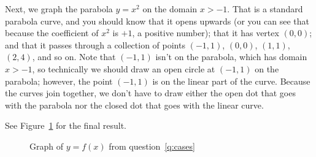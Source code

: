 \documentclass{article}
\begin{document}
\begin{enumerate}
  Next, we graph the parabola $y=x^2$ on the domain $x>-1$.  That is a 
  standard parabola curve, and you should know that it opens upwards
  (or you can see that because the coefficient of $x^2$ is $+1$, a positive
  number); that it has vertex $(0,0)$; and that it passes through a 
  collection of points $(-1,1)$, $(0,0)$, $(1,1)$, $(2,4)$, and so on.
  Note that $(-1,1)$ isn't on the parabola, which has 
  domain $x>-1$, so technically we should draw an open circle at $(-1,1)$
  on the parabola; however, the point $(-1,1)$ is on the linear part of
  the curve.  Because the curves join together, we don't have to draw either
  the open dot that goes with the parabola nor the closed dot that goes
  with the linear curve.

  See Figure~\ref{fig:cases} for the final result.
  \begin{figure}[htbp]
    \centering
    \caption{Graph of $y=f(x)$ from question~\ref{q:cases}}
    \label{fig:cases}
  \end{figure}
\end{enumerate}
\end{document}
